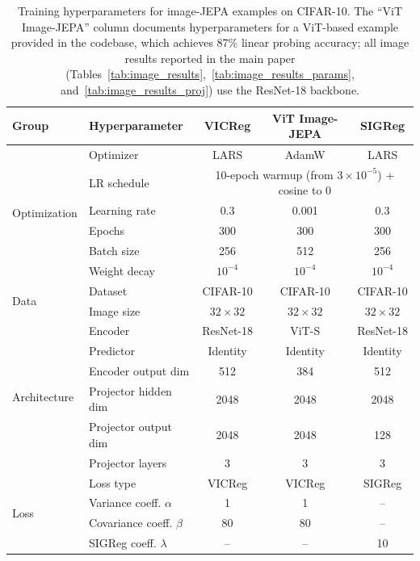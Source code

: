 \documentclass{article}
\begin{document}
\begin{table}[h]
\centering
\caption{Training hyperparameters for image-JEPA examples on CIFAR-10. The ``ViT Image-JEPA'' column documents hyperparameters for a ViT-based example provided in the codebase, which achieves 87\% linear probing accuracy; all image results reported in the main paper (Tables~\ref{tab:image_results},~\ref{tab:image_results_params}, and~\ref{tab:image_results_proj}) use the ResNet-18 backbone.}
\label{tab:image_hyperparams}
\begin{tabular}{llccc}
\toprule
\textbf{Group} & \textbf{Hyperparameter} & \textbf{VICReg} & \textbf{ViT Image-JEPA} & \textbf{SIGReg} \\
\midrule
\multirow{6}{*}{Optimization} & Optimizer & LARS & AdamW & LARS \\
 & LR schedule & \multicolumn{3}{c}{10-epoch warmup (from $3 \times 10^{-5}$) + cosine to 0} \\
 & Learning rate & 0.3 & 0.001 & 0.3 \\
 & Epochs & 300 & 300 & 300 \\
 & Batch size & 256 & 512 & 256 \\
 & Weight decay & $10^{-4}$ & $10^{-4}$ & $10^{-4}$ \\
\midrule
\multirow{2}{*}{Data} & Dataset & CIFAR-10 & CIFAR-10 & CIFAR-10 \\
 & Image size & $32 \times 32$ & $32 \times 32$ & $32 \times 32$ \\
\midrule
\multirow{6}{*}{Architecture} & Encoder & ResNet-18 & ViT-S & ResNet-18 \\
 & Predictor & Identity & Identity & Identity \\
 & Encoder output dim & 512 & 384 & 512 \\
 & Projector hidden dim & 2048 & 2048 & 2048 \\
 & Projector output dim & 2048 & 2048 & 128 \\
 & Projector layers & 3 & 3 & 3 \\
\midrule
\multirow{4}{*}{Loss} & Loss type & VICReg & VICReg & SIGReg \\
 & Variance coeff. $\alpha$ & 1 & 1 & -- \\
 & Covariance coeff. $\beta$ & 80 & 80 & -- \\
 & SIGReg coeff. $\lambda$ & -- & -- & 10 \\
\bottomrule
\end{tabular}
\end{table}
\end{document}
